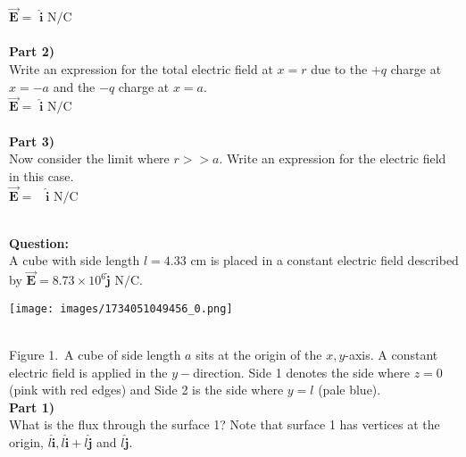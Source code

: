 \documentclass[addpoints,12pt, margin-left=35px]{exam}
\begin{document}
$ \mathbf{\vec{E}} = $  \underline{\hspace{3cm}}  $\mathbf{\hat{i}} \text{ N/C} $ \\

\\

\textbf{Part 2)}\\

Write an expression for the total electric field at $x=r$ due to the $+q$ charge at $x=-a$ and the $-q$ charge at $x=a.$\\

$ \mathbf{\vec{E}} = $  \underline{\hspace{3cm}}  $\mathbf{\hat{i}} \text{ N/C} $ \\

\\

\textbf{Part 3)}\\

Now consider the limit where $r >> a.$ Write an expression for the electric field in this case.\\

$ \mathbf{\vec{E}} = $  \underline{\hspace{3cm}}  $\mathbf{\hat{i}} \text{ N/C} $ \\

\\

\newpage

\textbf{Question:}\\

A cube with side length $l = {4.33} \text{ cm}$ is placed in a constant electric field described by $\mathbf{\vec{E}} = {8.73 \times 10^{6}} \mathbf{\hat{j}} \text{ N/C.}$\\

\begin{center}
\texttt{[image: images/1734051049456\_0.png]}
\end{center}\\

Figure 1. A cube of side length $a$ sits at the origin of the $x,y$-axis. A constant electric field is applied in the $y-$direction. Side 1 denotes the side where $z=0$ (pink with red edges) and Side 2 is the side where $y=l$ (pale blue).\\

\textbf{Part 1)}\\

What is the flux through the surface 1? Note that surface 1 has vertices at the origin, $l \mathbf{\hat{i}}, l\mathbf{\hat{i}} + l\mathbf{\hat{j}}$ and $l\mathbf{\hat{j}}.$\\
\end{document}
